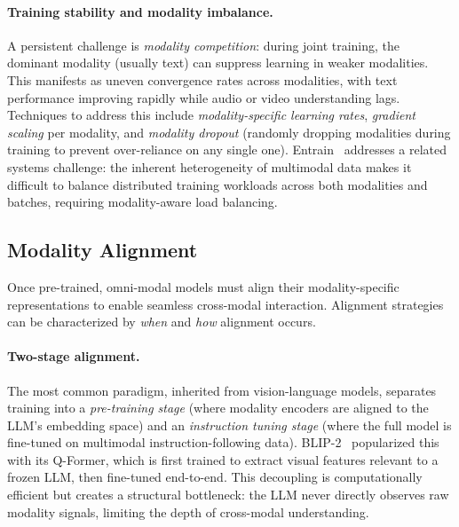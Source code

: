 \documentclass{article}
\begin{document}
\paragraph{Training stability and modality imbalance.}
A persistent challenge is \emph{modality competition}: during joint training, the dominant modality (usually text) can suppress learning in weaker modalities.
This manifests as uneven convergence rates across modalities, with text performance improving rapidly while audio or video understanding lags.
Techniques to address this include \emph{modality-specific learning rates}, \emph{gradient scaling} per modality, and \emph{modality dropout} (randomly dropping modalities during training to prevent over-reliance on any single one).
Entrain~\cite{placeholder2026entrain} addresses a related systems challenge: the inherent heterogeneity of multimodal data makes it difficult to balance distributed training workloads across both modalities and batches, requiring modality-aware load balancing.

\subsection{Modality Alignment}

Once pre-trained, omni-modal models must align their modality-specific representations to enable seamless cross-modal interaction.
Alignment strategies can be characterized by \emph{when} and \emph{how} alignment occurs.

\paragraph{Two-stage alignment.}
The most common paradigm, inherited from vision-language models, separates training into a \emph{pre-training stage} (where modality encoders are aligned to the LLM's embedding space) and an \emph{instruction tuning stage} (where the full model is fine-tuned on multimodal instruction-following data).
BLIP-2~\cite{li2023blip2} popularized this with its Q-Former, which is first trained to extract visual features relevant to a frozen LLM, then fine-tuned end-to-end.
This decoupling is computationally efficient but creates a structural bottleneck: the LLM never directly observes raw modality signals, limiting the depth of cross-modal understanding.
\end{document}
